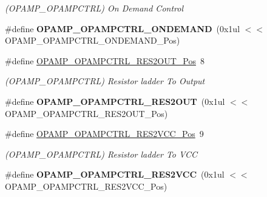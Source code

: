 \begin{DoxyCompactItemize}
\begin{DoxyCompactList}\small\item\em (O\+P\+A\+M\+P\+\_\+\+O\+P\+A\+M\+P\+C\+T\+R\+L) On Demand Control \end{DoxyCompactList}\item 
\hypertarget{group___s_a_m_l21___o_p_a_m_p_gae1fc65a89daf7d7cac6c3e45ab95789e}{}\#define {\bfseries O\+P\+A\+M\+P\+\_\+\+O\+P\+A\+M\+P\+C\+T\+R\+L\+\_\+\+O\+N\+D\+E\+M\+A\+N\+D}~(0x1ul $<$$<$ O\+P\+A\+M\+P\+\_\+\+O\+P\+A\+M\+P\+C\+T\+R\+L\+\_\+\+O\+N\+D\+E\+M\+A\+N\+D\+\_\+\+Pos)\label{group___s_a_m_l21___o_p_a_m_p_gae1fc65a89daf7d7cac6c3e45ab95789e}

\item 
\hypertarget{group___s_a_m_l21___o_p_a_m_p_ga5048f87cc2149582549748c7c5eca991}{}\#define \hyperlink{group___s_a_m_l21___o_p_a_m_p_ga5048f87cc2149582549748c7c5eca991}{O\+P\+A\+M\+P\+\_\+\+O\+P\+A\+M\+P\+C\+T\+R\+L\+\_\+\+R\+E\+S2\+O\+U\+T\+\_\+\+Pos}~8\label{group___s_a_m_l21___o_p_a_m_p_ga5048f87cc2149582549748c7c5eca991}

\begin{DoxyCompactList}\small\item\em (O\+P\+A\+M\+P\+\_\+\+O\+P\+A\+M\+P\+C\+T\+R\+L) Resistor ladder To Output \end{DoxyCompactList}\item 
\hypertarget{group___s_a_m_l21___o_p_a_m_p_gac85446f236cfc5d5d6fdb82e670da926}{}\#define {\bfseries O\+P\+A\+M\+P\+\_\+\+O\+P\+A\+M\+P\+C\+T\+R\+L\+\_\+\+R\+E\+S2\+O\+U\+T}~(0x1ul $<$$<$ O\+P\+A\+M\+P\+\_\+\+O\+P\+A\+M\+P\+C\+T\+R\+L\+\_\+\+R\+E\+S2\+O\+U\+T\+\_\+\+Pos)\label{group___s_a_m_l21___o_p_a_m_p_gac85446f236cfc5d5d6fdb82e670da926}

\item 
\hypertarget{group___s_a_m_l21___o_p_a_m_p_ga8156a540cbb3341e5ef2ceaa5cf37add}{}\#define \hyperlink{group___s_a_m_l21___o_p_a_m_p_ga8156a540cbb3341e5ef2ceaa5cf37add}{O\+P\+A\+M\+P\+\_\+\+O\+P\+A\+M\+P\+C\+T\+R\+L\+\_\+\+R\+E\+S2\+V\+C\+C\+\_\+\+Pos}~9\label{group___s_a_m_l21___o_p_a_m_p_ga8156a540cbb3341e5ef2ceaa5cf37add}

\begin{DoxyCompactList}\small\item\em (O\+P\+A\+M\+P\+\_\+\+O\+P\+A\+M\+P\+C\+T\+R\+L) Resistor ladder To V\+C\+C \end{DoxyCompactList}\item 
\hypertarget{group___s_a_m_l21___o_p_a_m_p_ga3bd3d635367e3eb421fa5a81c7772631}{}\#define {\bfseries O\+P\+A\+M\+P\+\_\+\+O\+P\+A\+M\+P\+C\+T\+R\+L\+\_\+\+R\+E\+S2\+V\+C\+C}~(0x1ul $<$$<$ O\+P\+A\+M\+P\+\_\+\+O\+P\+A\+M\+P\+C\+T\+R\+L\+\_\+\+R\+E\+S2\+V\+C\+C\+\_\+\+Pos)\label{group___s_a_m_l21___o_p_a_m_p_ga3bd3d635367e3eb421fa5a81c7772631}


\end{DoxyCompactItemize}

